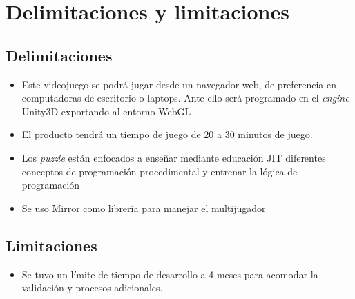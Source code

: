 \section{Delimitaciones y limitaciones}
\subsection{Delimitaciones}
\begin{itemize}
    \item Este videojuego se podrá jugar desde un navegador web, de preferencia en computadoras de escritorio o laptops. Ante ello será programado en el \textit{engine} Unity3D exportando al entorno WebGL
    \item El producto tendrá un tiempo de juego de 20 a 30 minutos de juego.
    \item Los \textit{puzzle} están enfocados a enseñar mediante educación JIT diferentes conceptos de programación procedimental y entrenar la lógica de programación
    \item Se uso Mirror como librería para manejar el multijugador
\end{itemize}
\subsection{Limitaciones}
\begin{itemize}
    \item Se tuvo un límite de tiempo de desarrollo a 4 meses para acomodar la validación y
procesos adicionales.

\end{itemize}
